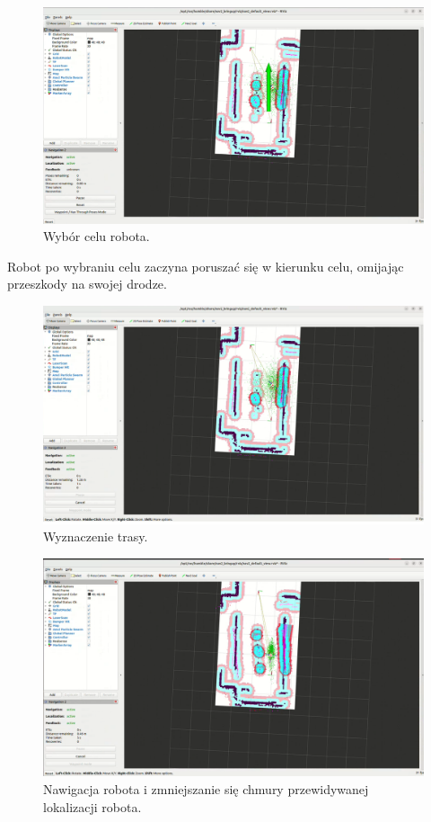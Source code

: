 \documentclass[a4paper,twoside,12pt]{book}
\begin{document}
\begin{figure}[!hb]
	\centering
	\includegraphics[width=1\textwidth]{images/launch-nav3.png}
	\caption{Wybór celu robota.}
	\label{fig:nav-map3}
\end{figure}
\newpage
Robot po wybraniu celu zaczyna poruszać się w kierunku celu, omijając przeszkody na swojej drodze.
\begin{figure}[!hb]
	\centering
	\includegraphics[width=1\textwidth]{images/launch-nav4.png}
	\caption{Wyznaczenie trasy.}
	\label{fig:nav-map4}
\end{figure}
\begin{figure}[!hb]
	\centering
	\includegraphics[width=1\textwidth]{images/launch-nav5.png}
	\caption{Nawigacja robota i zmniejszanie się chmury przewidywanej lokalizacji robota.}
	\label{fig:nav-map5}
\end{figure}
\end{document}
